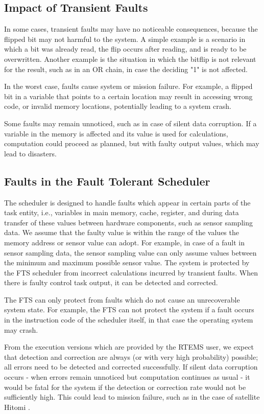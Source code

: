 \subsection{Impact of Transient Faults}
In some cases, transient faults may have no noticeable consequences, because the flipped bit may not harmful to the system. A simple example is a scenario in which a bit was already read, the flip occurs after reading, and is ready to be overwritten. Another example is the situation in which the bitflip is not relevant for the result, such as in an OR chain, in case the deciding "1" is not affected.

In the worst case, faults cause system or mission failure. For example, a flipped bit in a variable that points to a certain location may result in accessing wrong code, or invalid memory locations, potentially leading to a system crash.

Some faults may remain unnoticed, such as in case of silent data corruption. If a variable in the memory is affected and its value is used for calculations, computation could proceed as planned, but with faulty output values, which may lead to disasters.

\subsection{Faults in the Fault Tolerant Scheduler}

The scheduler is designed to handle faults which appear in certain parts of the task entity, i.e., variables in main memory, cache, register, and during data transfer of these values between hardware components, such as sensor sampling data. We assume that the faulty value is within the range of the values the memory address or sensor value can adopt. For example, in case of a fault in sensor sampling data, the sensor sampling value can only assume values between the minimum and maximum possible sensor value. The system is protected by the FTS scheduler from incorrect calculations incurred by transient faults. When there is faulty  control task output, it can be detected and corrected.

The FTS can only protect from faults which do not cause an unrecoverable system state. For example, the FTS can not protect the system if a fault occurs in the instruction code of the scheduler itself, in that case the operating system may crash.

From the execution versions which are provided by the RTEMS user, we expect that detection and correction are always (or with very high probability) possible; all errors need to be detected and corrected successfully. If silent data corruption occurs - when errors remain unnoticed but computation continues as usual - it would be fatal for the system if the detection or correction rate would not be sufficiently high. This could lead to mission failure, such as in the case of satellite Hitomi \cite{hitomi}.
